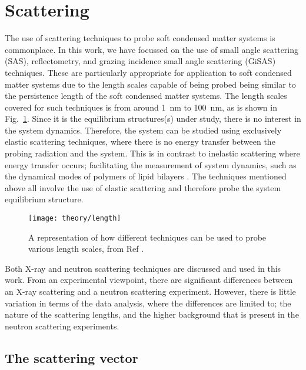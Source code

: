 \section{Scattering}

The use of scattering techniques to probe soft condensed matter systems is commonplace.
In this work, we have focussed on the use of small angle scattering (SAS), reflectometry, and grazing incidence small angle scattering (GiSAS) techniques.
These are particularly appropriate for application to soft condensed matter systems due to the length scales capable of being probed being similar to the persistence length of the soft condensed matter systems.
The length scales covered for such techniques is from around \SI{1}{\nano\metre} to \SI{100}{\nano\metre}, as is shown in Fig.~\ref{fig:lengths}.
Since it is the equilibrium structures(s) under study, there is no interest in the system dynamics.
Therefore, the system can be studied using exclusively elastic scattering techniques, where there is no energy transfer between the probing radiation and the system.
This is in contrast to inelastic scattering where energy transfer occurs; facilitating the measurement of system dynamics, such as the dynamical modes of polymers of lipid bilayers \cite{Sakai2009, Farago2009}.
The techniques mentioned above all involve the use of elastic scattering and therefore probe the system equilibrium structure.
%
\begin{figure}
	\centering
	\texttt{[image: theory/length]}
	\caption{A representation of how different techniques can be used to probe various length scales, from Ref \cite{Sivia2011}.}
	\label{fig:lengths}
\end{figure}
%

Both X-ray and neutron scattering techniques are discussed and used in this work.
From an experimental viewpoint, there are significant differences between an X-ray scattering and a neutron scattering experiment.
However, there is little variation in terms of the data analysis, where the differences are limited to; the nature of the scattering lengths, and the higher background that is present in the neutron scattering experiments.

\subsection{The scattering vector}

